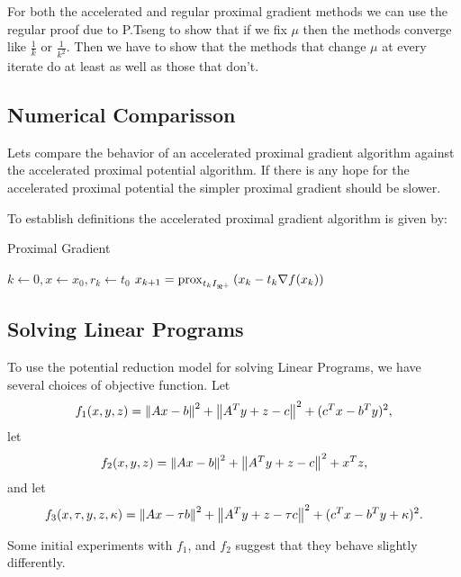 \documentclass[smallextended]{article}       %
\begin{document}
 For both the accelerated and regular proximal gradient methods we can use the
 regular proof due to P.Tseng to show that if we fix $\mu$ then the methods
 converge like $\frac{1}{k}$ or $\frac{1}{k^2}$.  Then we have to show that the
 methods that change $\mu$ at every iterate do at least as well as those that
 don't.

 \subsection{Numerical Comparisson}
 Lets compare the behavior of an accelerated proximal gradient algorithm against 
 the accelerated proximal potential algorithm. If there is any hope for the 
 accelerated proximal potential the simpler proximal gradient should be slower.
    
 To establish definitions the accelerated proximal gradient algorithm is given by:
\begin{algorithm}
  \caption{Proximal Gradient}
  \begin{algorithmic}
  \STATE $k \gets 0, x \gets x_0, r_k \gets t_0$
  \STATE $x_{k+1} = \operatorname{prox}_{t_k I_{\Re^{+}}}{\left(x_k - t_k \nabla f(x_k)  \right)}$
  \ENDWHILE
  \end{algorithmic}
  \label{alg:pg}
\end{algorithm}

 \subsection{Solving Linear Programs}
 To use the potential reduction model for solving Linear Programs, 
 we have several choices of objective function.
 Let 
 \[
 f_1(x,y,z) = \left\| Ax-b \right\|^2 + \left\| A^Ty+z-c \right\|^2 + (c^Tx-b^Ty)^2,
 \]
 let 
  \[
 f_2(x,y,z) = \left\| Ax-b \right\|^2 + \left\| A^Ty+z-c \right\|^2 + x^Tz, 
 \]
 and let
  \[
 f_3(x,\tau,y,z,\kappa) = \left\| Ax-\tau b \right\|^2 + \left\| A^Ty+z-\tau c \right\|^2 + (c^Tx-b^Ty+\kappa)^2.
 \]

 Some initial experiments with $f_1$, and $f_2$ suggest that they behave slightly differently.
 
 
\end{document}
